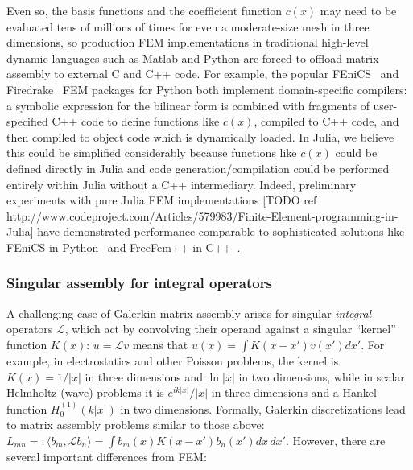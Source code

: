 Even so, the basis functions and the coefficient function $c(x)$ may need to be
evaluated tens of millions of times for even a moderate-size mesh in three dimensions,
so production FEM implementations in traditional high-level dynamic languages such as
Matlab and Python are forced to offload matrix assembly to external C and C++ code.
For example, the popular FEniCS~\cite{LoggOlgaardEtAl2012a} and
Firedrake~\cite{Rathgeber2015} FEM packages for
Python both implement domain-specific compilers: a symbolic expression for the bilinear
form is combined with fragments of user-specified C++ code to define functions like
$c(x)$, compiled to C++ code, and then compiled to object code which is dynamically
loaded.
In Julia, we believe this could be simplified considerably because functions like
$c(x)$ could be defined directly in Julia and code generation/compilation could be
performed entirely within Julia without a C++ intermediary.
Indeed, preliminary experiments with pure Julia FEM implementations
[TODO ref http://www.codeproject.com/Articles/579983/Finite-Element-programming-in-Julia]
have demonstrated performance comparable to sophisticated solutions like FEniCS in
Python~\cite{FEniCS12} and FreeFem++ in C++~\cite{MR3043640}.

\subsubsection{Singular assembly for integral operators}

\fi

A challenging case of Galerkin matrix assembly arises for singular
\emph{integral} operators $\mathcal{L}$, which act by
convolving their operand against a singular ``kernel'' function
$K(x)$: $u = \mathcal{L} v$ means that $u(x) = \int K(x - x') v(x')
dx'$.
For example, in electrostatics and other Poisson problems, the
kernel is $K(x) = 1/|x|$ in three dimensions and $\ln |x|$ in two
dimensions, while in scalar Helmholtz (wave) problems it is
$e^{ik|x|}/|x|$ in three dimensions and a Hankel function
$H^{(1)}_0(k|x|)$ in two dimensions.
Formally, Galerkin discretizations lead to matrix assembly problems
similar to those above:
$L_{mn} =: \langle b_m, \mathcal{L} b_n \rangle = \int b_m(x) K(x - x') b_n(x') dx\,dx'$.
However, there are several important differences from FEM:

